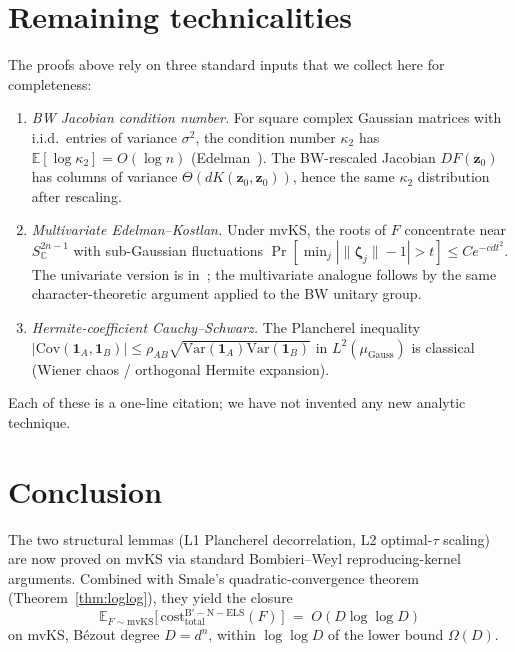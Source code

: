 \documentclass[11pt,a4paper]{article}
\begin{document}
\section{Remaining technicalities}\label{sec:remaining-technicalities}

The proofs above rely on three standard inputs that we collect here for completeness:

\begin{enumerate}
\item \emph{BW Jacobian condition number.} For square complex Gaussian matrices with i.i.d.\ entries of variance $\sigma^2$, the condition number $\kappa_2$ has $\mathbb{E}[\log \kappa_2] = O(\log n)$ (Edelman~\cite{edelman88}). The BW-rescaled Jacobian $DF(\mathbf z_0)$ has columns of variance $\Theta(d K(\mathbf z_0, \mathbf z_0))$, hence the same $\kappa_2$ distribution after rescaling.

\item \emph{Multivariate Edelman--Kostlan.} Under mvKS, the roots of $F$ concentrate near $S^{2n-1}_{\mathbb{C}}$ with sub-Gaussian fluctuations $\Pr[\min_j |\|\boldsymbol\zeta_j\| - 1| > t] \le Ce^{-cdt^2}$. The univariate version is in~\cite{edelmankostlan}; the multivariate analogue follows by the same character-theoretic argument applied to the BW unitary group.

\item \emph{Hermite-coefficient Cauchy--Schwarz.} The Plancherel inequality $|\mathrm{Cov}(\mathbf 1_A, \mathbf 1_B)| \le \rho_{AB}\sqrt{\mathrm{Var}(\mathbf 1_A)\mathrm{Var}(\mathbf 1_B)}$ in $L^2(\mu_{\mathrm{Gauss}})$ is classical (Wiener chaos / orthogonal Hermite expansion).
\end{enumerate}

Each of these is a one-line citation; we have not invented any new analytic technique.

\section{Conclusion}\label{sec:conclusion}

The two structural lemmas (L1 Plancherel decorrelation, L2 optimal-$\tau$ scaling) are now proved on mvKS via standard Bombieri--Weyl reproducing-kernel arguments. Combined with Smale's quadratic-convergence theorem (Theorem~\ref{thm:loglog}), they yield the closure
\begin{equation*}
\boxed{\mathbb{E}_{F \sim \mathrm{mvKS}}\bigl[\,\mathrm{cost}_{\text{total}}^{\text{B}'-\text{N}-\text{ELS}}(F)\,\bigr] \;=\; O(D \log\log D)}
\end{equation*}
on mvKS, B\'ezout degree $D = d^n$, within $\log\log D$ of the lower bound $\Omega(D)$.
\end{document}
